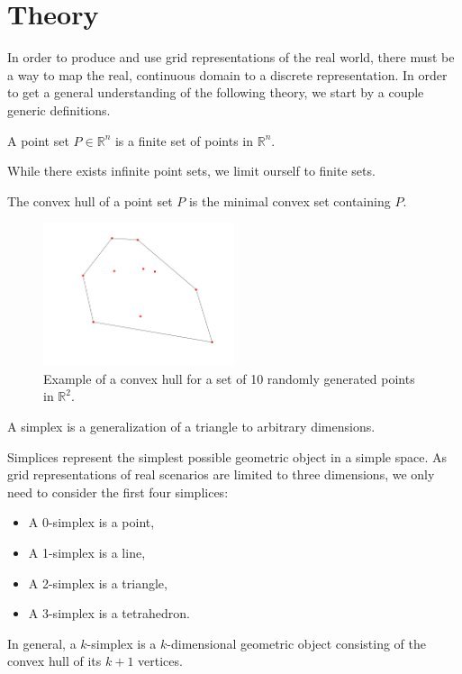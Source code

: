 \section{Theory}
In order to produce and use grid representations of the real world, there must be a way to map the real, continuous domain to a discrete representation. In order to get a general understanding of the following theory, we start by a couple generic definitions.

\begin{definition}
A point set $P \in \mathbb{R}^n$ is a finite set of points in $\mathbb{R}^n$.
\end{definition}
While there exists infinite point sets, we limit ourself to finite sets.


\begin{definition}
The convex hull of a point set $P$ is the minimal convex set containing $P$.
\end{definition}
\begin{figure}[h]
    \centering
    \includegraphics[width=0.5\textwidth]{report/Images/Theory/convex_hull.png}
    \caption[Example of a convex hull]{Example of a convex hull for a set of 10 randomly generated points in $\mathbb{R}^2$.}
    \label{fig:ex:convex_hull}
\end{figure}


\begin{definition}[Simplex]
A simplex is a generalization of a triangle to arbitrary dimensions.
\end{definition}
Simplices represent the simplest possible geometric object in a simple space. As grid representations of real scenarios are limited to three dimensions, we only need to consider the first four simplices:
\begin{itemize}
    \item A 0-simplex is a point,
    \item A 1-simplex is a line,
    \item A 2-simplex is a triangle,
    \item A 3-simplex is a tetrahedron.
\end{itemize}
In general, a $k$-simplex is a $k$-dimensional geometric object consisting of the convex hull of its $k + 1$ vertices.


